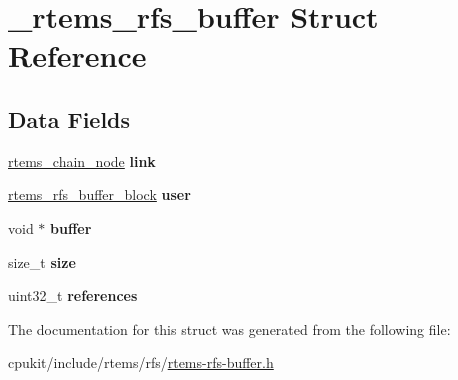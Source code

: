 \hypertarget{struct__rtems__rfs__buffer}{}\section{\+\_\+rtems\+\_\+rfs\+\_\+buffer Struct Reference}
\label{struct__rtems__rfs__buffer}
\subsection*{Data Fields}
\begin{DoxyCompactItemize}
\item 
\mbox{\label{struct__rtems__rfs__buffer_a45e38a6a9b4b1fcfdbfc70e2d4b51108}} 
\mbox{\hyperlink{structChain__Node__struct}{rtems\+\_\+chain\+\_\+node}} {\bfseries link}
\item 
\mbox{\label{struct__rtems__rfs__buffer_ade45d92c160c7da3b4db541599507860}} 
\mbox{\hyperlink{rtems-rfs-buffer_8h_a5650d53328a5af0a78198fe780aec043}{rtems\+\_\+rfs\+\_\+buffer\+\_\+block}} {\bfseries user}
\item 
\mbox{\label{struct__rtems__rfs__buffer_aff058e1f55c20058425bfbfc8a3e1e3c}} 
void $\ast$ {\bfseries buffer}
\item 
\mbox{\label{struct__rtems__rfs__buffer_a857aab8a44f47f30fb042f752e8b50e7}} 
size\+\_\+t {\bfseries size}
\item 
\mbox{\label{struct__rtems__rfs__buffer_ae2c08a1c1ea7983da6cdd4776d918120}} 
uint32\+\_\+t {\bfseries references}
\end{DoxyCompactItemize}


The documentation for this struct was generated from the following file\+:\begin{DoxyCompactItemize}
\item 
cpukit/include/rtems/rfs/\mbox{\hyperlink{rtems-rfs-buffer_8h}{rtems-\/rfs-\/buffer.\+h}}\end{DoxyCompactItemize}
